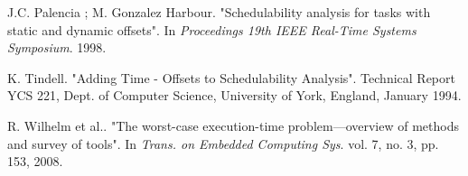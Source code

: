 \documentclass{article}
\begin{document}
\begin{thebibliography}{1}
J.C. Palencia ; M. Gonzalez Harbour.
\newblock "Schedulability analysis for tasks with static and dynamic offsets".
\newblock In {\em Proceedings 19th IEEE Real-Time Systems Symposium}. 1998.

K. Tindell.
\newblock "Adding Time - Offsets to Schedulability Analysis".
\newblock Technical Report YCS 221, Dept. of Computer Science, University of York, England, January 1994.

R. Wilhelm et al..
\newblock "The worst-case execution-time problem—overview of methods and survey of tools".
\newblock In {\em Trans. on Embedded Computing Sys}. vol. 7, no. 3, pp. 153, 2008.

\end{thebibliography}
\end{document}
